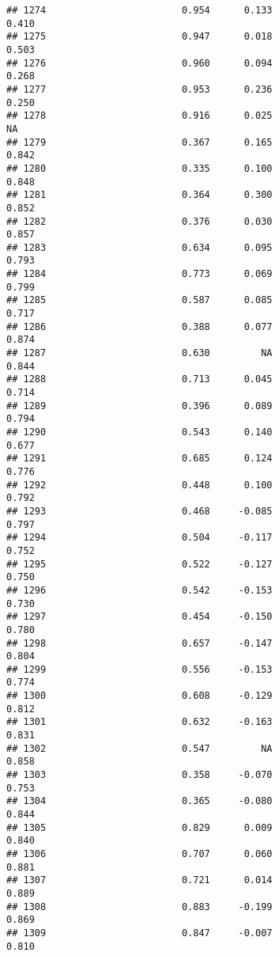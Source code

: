 \documentclass[
]{article}
\begin{document}
\begin{verbatim}
## 1274                        0.954      0.133                     0.410
## 1275                        0.947      0.018                     0.503
## 1276                        0.960      0.094                     0.268
## 1277                        0.953      0.236                     0.250
## 1278                        0.916      0.025                        NA
## 1279                        0.367      0.165                     0.842
## 1280                        0.335      0.100                     0.848
## 1281                        0.364      0.300                     0.852
## 1282                        0.376      0.030                     0.857
## 1283                        0.634      0.095                     0.793
## 1284                        0.773      0.069                     0.799
## 1285                        0.587      0.085                     0.717
## 1286                        0.388      0.077                     0.874
## 1287                        0.630         NA                     0.844
## 1288                        0.713      0.045                     0.714
## 1289                        0.396      0.089                     0.794
## 1290                        0.543      0.140                     0.677
## 1291                        0.685      0.124                     0.776
## 1292                        0.448      0.100                     0.792
## 1293                        0.468     -0.085                     0.797
## 1294                        0.504     -0.117                     0.752
## 1295                        0.522     -0.127                     0.750
## 1296                        0.542     -0.153                     0.730
## 1297                        0.454     -0.150                     0.780
## 1298                        0.657     -0.147                     0.804
## 1299                        0.556     -0.153                     0.774
## 1300                        0.608     -0.129                     0.812
## 1301                        0.632     -0.163                     0.831
## 1302                        0.547         NA                     0.858
## 1303                        0.358     -0.070                     0.753
## 1304                        0.365     -0.080                     0.844
## 1305                        0.829      0.009                     0.840
## 1306                        0.707      0.060                     0.881
## 1307                        0.721      0.014                     0.889
## 1308                        0.883     -0.199                     0.869
## 1309                        0.847     -0.007                     0.810

\end{verbatim}
\end{document}
